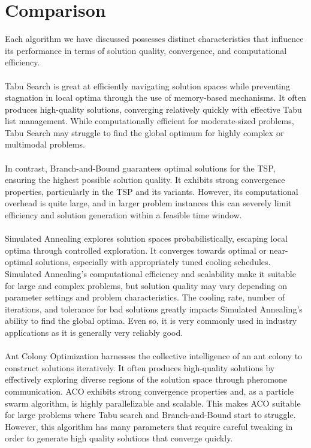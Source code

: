 \documentclass{article}
\begin{document}
\newpage
\section{Comparison}
Each algorithm we have discussed possesses distinct characteristics that influence its performance in terms of solution quality, convergence, and computational efficiency.
\\\\
Tabu Search is great at efficiently navigating solution spaces while preventing stagnation in local optima through the use of memory-based mechanisms. It often produces high-quality solutions, converging relatively quickly with effective Tabu list management. While computationally efficient for moderate-sized problems, Tabu Search may struggle to find the global optimum for highly complex or multimodal problems.
\\\\
In contrast, Branch-and-Bound guarantees optimal solutions for the TSP, ensuring the highest possible solution quality. It exhibits strong convergence properties, particularly in the TSP and its variants. However, its computational overhead is quite large, and in larger problem instances this can severely limit efficiency and solution generation within a feasible time window.
\\\\
Simulated Annealing explores solution spaces probabilistically, escaping local optima through controlled exploration. It converges towards optimal or near-optimal solutions, especially with appropriately tuned cooling schedules. Simulated Annealing's computational efficiency and scalability make it suitable for large and complex problems, but solution quality may vary depending on parameter settings and problem characteristics. The cooling rate, number of iterations, and tolerance for bad solutions greatly impacts Simulated Annealing's ability to find the global optima. Even so, it is very commonly used in industry applications as it is generally very reliably good. 
\\\\
Ant Colony Optimization harnesses the collective intelligence of an ant colony to construct solutions iteratively. It often produces high-quality solutions by effectively exploring diverse regions of the solution space through pheromone communication. ACO exhibits strong convergence properties and, as a particle swarm algorithm, is highly parallelizable and scalable. This makes ACO suitable for large problems where Tabu search and Branch-and-Bound start to struggle. However, this algorithm has many parameters that require careful tweaking in order to generate high quality solutions that converge quickly.
\end{document}
